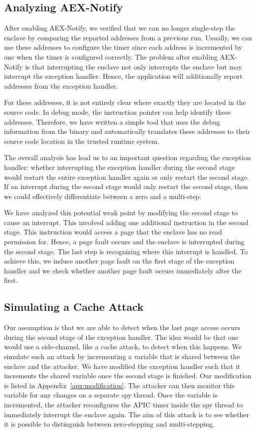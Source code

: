 \documentclass{llncs}
\begin{document}
\subsection{Analyzing AEX-Notify}

After enabling AEX-Notify, we verified that we can no longer single-step the
enclave by comparing the reported addresses from a previous run.
Usually, we can use these addresses to configure the timer since each address
is incremented by one when the timer is configured correctly.
The problem after enabling AEX-Notify is that interrupting the enclave not only
interrupts the enclave but may interrupt the exception handler.
Hence, the application will additionally report addresses from the exception
handler.

For these addresses, it is not entirely clear where exactly they are located in
the source code.
In debug mode, the instruction pointer can help identify these addresses.
Therefore, we have written a simple tool that uses the debug information from
the binary and automatically translates these addresses to their source code
location in the trusted runtime system.

The overall analysis has lead us to an important question regarding the
exception handler:
whether interrupting the exception handler during the second stage would
restart the entire exception handler again or only restart the second stage.
If an interrupt during the second stage would only restart the second stage,
then we could effectively differentiate between a zero and a multi-step.

We have analyzed this potential weak point by modifying the second stage to
cause an interrupt.
This involved adding one additional instruction in the second stage.
This instruction would access a page that the enclave has no read permission for.
Hence, a page fault occurs and the enclave is interrupted during the second stage.
The last step is recognizing where this interrupt is handled.
To achieve this, we induce another page fault on the first stage of the exception handler
and we check whether another page fault occurs immediately after the first.

\subsection{Simulating a Cache Attack}

Our assumption is that we are able to detect when the last page access occurs
during the second stage of the exception handler.
The idea would be that one would use a side-channel, like a cache attack, to
detect when this happens.
We simulate such an attack by incrementing a variable that is shared between
the enclave and the attacker.
We have modified the exception handler such that it increments the shared
variable once the second stage is finished.
Our modification is listed in Appendix~\ref{apx:modification}.
The attacker can then monitor this variable for any changes on a separate spy thread.
Once the variable is incremented, the attacker reconfigures the APIC timer
inside the spy thread to immediately interrupt the enclave again.
The aim of this attack is to see whether it is possible to distinguish between
zero-stepping and multi-stepping.
\end{document}
